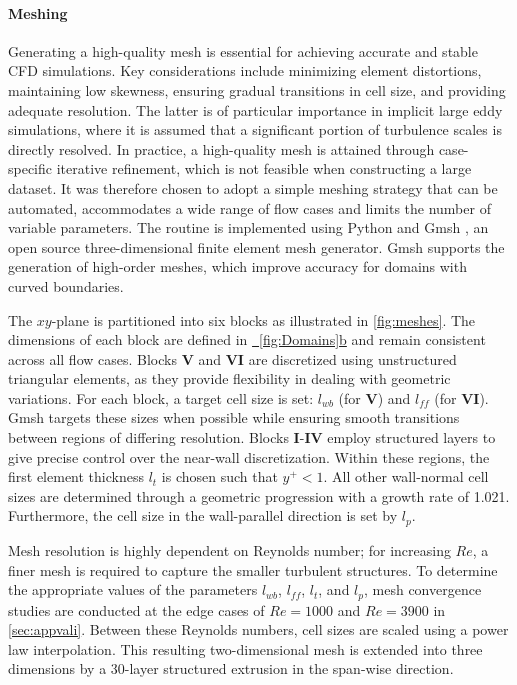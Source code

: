 \documentclass{article}
\newcommand{\subfigref}[2]{\hyperref[#1]{\figureautorefname~\ref*{#1}#2}}
\begin{document}
\paragraph{Meshing}
Generating a high-quality mesh is essential for achieving accurate and stable CFD simulations. Key considerations include minimizing element distortions, maintaining low skewness, ensuring gradual transitions in cell size, and providing adequate resolution. The latter is of particular importance in implicit large eddy simulations, where it is assumed that a significant portion of turbulence scales is directly resolved. In practice, a high-quality mesh is attained through case-specific iterative refinement, which is not feasible when constructing a large dataset. It was therefore chosen to adopt a simple meshing strategy that can be automated, accommodates a wide range of flow cases and limits the number of variable parameters. The routine is implemented using Python and Gmsh \citep{GMSH}, an open source three-dimensional finite element mesh generator. Gmsh supports the generation of high-order meshes, which improve accuracy for domains with curved boundaries.

The $xy$-plane is partitioned into six blocks as illustrated in \autoref{fig:meshes}. The dimensions of each block are defined in \subfigref{fig:Domains}{b} and remain consistent across all flow cases. Blocks $\textbf{V}$ and $\textbf{VI}$ are discretized using unstructured triangular elements, as they provide flexibility in dealing with geometric variations. For each block, a target cell size is set: $l_{wb}$ (for $\textbf{V}$) and $l_{ff}$ (for $\textbf{VI}$). Gmsh targets these sizes when possible while ensuring smooth transitions between regions of differing resolution. Blocks $\textbf{I}$-$\textbf{IV}$ employ structured layers to give precise control over the near-wall discretization. Within these regions, the first element thickness $l_t$ is chosen such that $y^+<1$. All other wall-normal cell sizes are determined through a geometric progression with a growth rate of 1.021. Furthermore, the cell size in the wall-parallel direction is set by $l_p$. 

Mesh resolution is highly dependent on Reynolds number; for increasing $Re$, a finer mesh is required to capture the smaller turbulent structures. To determine the appropriate values of the parameters $l_{wb}$, $l_{ff}$, $l_t$, and $l_p$, mesh convergence studies are conducted at the edge cases of $Re = 1000$ and $Re = 3900$ in \autoref{sec:appvali}. Between these Reynolds numbers, cell sizes are scaled using a power law interpolation. This resulting two-dimensional mesh is extended into three dimensions by a 30-layer structured extrusion in the span-wise direction. 
\end{document}
